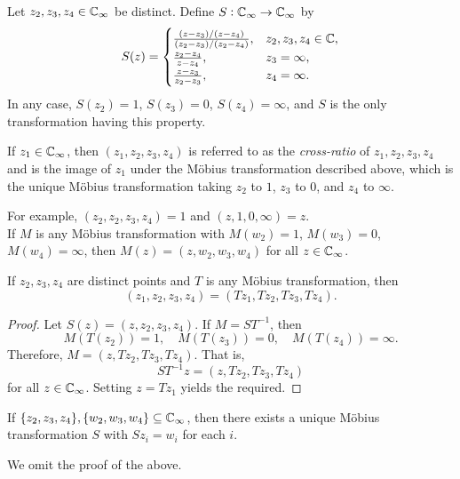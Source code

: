 	Let $z_2,z_3,z_4 \in \mathbb{C}_\infty$ be distinct. Define $S:\mathbb{C}_\infty\to\mathbb{C}_\infty$ by
	\[
	S(z) =
	\begin{cases}
		\frac{(z-z_3)/(z-z_4)}{(z_2-z_3)/(z_2-z_4)}, & z_2,z_3,z_4 \in \mathbb{C}, \\
		\frac{z_2-z_4}{z-z_4}, & z_3 = \infty, \\
		\frac{z-z_3}{z_2-z_3}, & z_4 = \infty. \\
	\end{cases}
	\]
	In any case, $S(z_2) = 1$, $S(z_3) = 0$, $S(z_4) = \infty$, and $S$ is the only transformation having this property.

	\begin{definition}
		If $z_1 \in \mathbb{C}_\infty$, then $(z_1,z_2,z_3,z_4)$ is referred to as the {\emph{cross-ratio}} of $z_1,z_2,z_3,z_4$ and is the image of $z_1$ under the M\"{o}bius transformation described above, which is the unique M\"{o}bius transformation taking $z_2$ to $1$, $z_3$ to $0$, and $z_4$ to $\infty$.
	\end{definition}

	For example, $(z_2,z_2,z_3,z_4) = 1$ and $(z,1,0,\infty) = z$.\\
	If $M$ is any M\"{o}bius transformation with $M(w_2) = 1$, $M(w_3) = 0$, $M(w_4) = \infty$, then $M(z) = (z,w_2,w_3,w_4)$ for all $z \in \mathbb{C}_\infty$.

	\begin{theorem}
		\label{thm: cross-product mobius equal}
		If $z_2,z_3,z_4$ are distinct points and $T$ is any M\"{o}bius transformation, then
		\[ (z_1,z_2,z_3,z_4) = (Tz_1,Tz_2,Tz_3,Tz_4). \]
	\end{theorem}
	\begin{proof}
		Let $S(z) = (z,z_2,z_3,z_4)$. If $M = ST^{-1}$, then
		\[ M(T(z_2)) = 1, \quad M(T(z_3)) = 0, \quad M(T(z_4)) = \infty. \]
		Therefore, $M = (z,Tz_2,Tz_3,Tz_4)$. That is,
		\[ ST^{-1}z = (z,Tz_2,Tz_3,Tz_4) \]
		for all $z \in \mathbb{C}_\infty$. Setting $z = Tz_1$ yields the required.
	\end{proof}

	\begin{lemma}
		If $\{z_2,z_3,z_4\},\{w_2,w_3,w_4\} \subseteq \mathbb{C}_\infty$, then there exists a unique M\"{o}bius transformation $S$ with $Sz_i = w_i$ for each $i$.
	\end{lemma}
	
	We omit the proof of the above.

